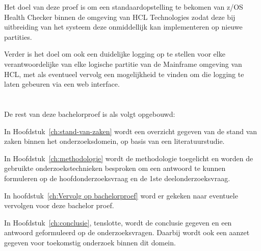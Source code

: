 Het doel van deze proef is om een standaardopstelling te bekomen van z/OS Health Checker binnen de omgeving van HCL Technologies zodat deze bij uitbreiding van het systeem deze onmiddellijk kan implementeren op nieuwe partities.

Verder is het doel om ook een duidelijke logging op te stellen voor elke verantwoordelijke van elke logische partitie van de Mainframe omgeving van HCL, met als eventueel vervolg een mogelijkheid te vinden om die logging te laten gebeuren via een web interface.

\section{}
\label{sec:opzet-bachelorproef}


De rest van deze bachelorproef is als volgt opgebouwd:

In Hoofdstuk~\ref{ch:stand-van-zaken} wordt een overzicht gegeven van de stand van zaken binnen het onderzoeksdomein, op basis van een literatuurstudie.

In Hoofdstuk~\ref{ch:methodologie} wordt de methodologie toegelicht en worden de gebruikte onderzoekstechnieken besproken om een antwoord te kunnen formuleren op de hoofdonderzoeksvraag en de 1ste deelonderzoeksvraag.

In hoofdstuk~\ref{ch:Vervolg op bachelorproef} word er gekeken naar eventuele vervolgen voor deze bachelor proef.



In Hoofdstuk~\ref{ch:conclusie}, tenslotte, wordt de conclusie gegeven en een antwoord geformuleerd op de onderzoeksvragen. Daarbij wordt ook een aanzet gegeven voor toekomstig onderzoek binnen dit domein.
